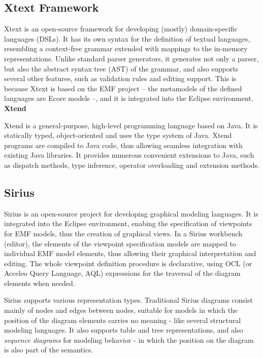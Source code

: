 \subsection{Xtext Framework} \label{subsec_xtext}
Xtext is an open-source framework for developing (mostly) domain-specific languages (DSLs). It has its own syntax for the definition of textual languages, resembling a context-free grammar extended with mappings to the in-memory representations. Unlike standard parser generators, it generates not only a parser, but also the abstract syntax tree (AST) of the grammar, and also supports several other features, such as validation rules and editing support. This is because Xtext is based on the EMF project -- the metamodels of the defined languages are Ecore models --, and it is integrated into the Eclipse environment.
\clearpage
\textbf{Xtend}

Xtend is a general-purpose, high-level programming language based on Java. It is statically typed, object-oriented and uses the type system of Java. Xtend programs are compiled to Java code, thus allowing seamless integration with existing Java libraries. It provides numerous convenient extensions to Java, such as dispatch methods, type inference, operator overloading and extension methods.

\subsection{Sirius} \label{subsec_sirius}
Sirius is an open-source project for developing graphical modeling languages. It is integrated into the Eclipse environment, enabing the specification of viewpoints for EMF models, thus the creation of graphical views. In a Sirius workbench (editor), the elements of the viewpoint specification models are mapped to individual EMF model elements, thus allowing their graphical interpretation and editing. The whole viewpoint definition procedure is declarative, using OCL \cite{OCLStandard} (or Acceleo Query Language, AQL) expressions for the traversal of the diagram elements when needed.

Sirius supports various representation types. Traditional Sirius diagrams consist mainly of nodes and edges between nodes, suitable for models in which the position of the diagram elements carries no meaning - like several structural modeling languages. It also supports table and tree representations, and also \textit{sequence diagrams} for modeling behavior - in which the position on the diagram is also part of the semantics.

